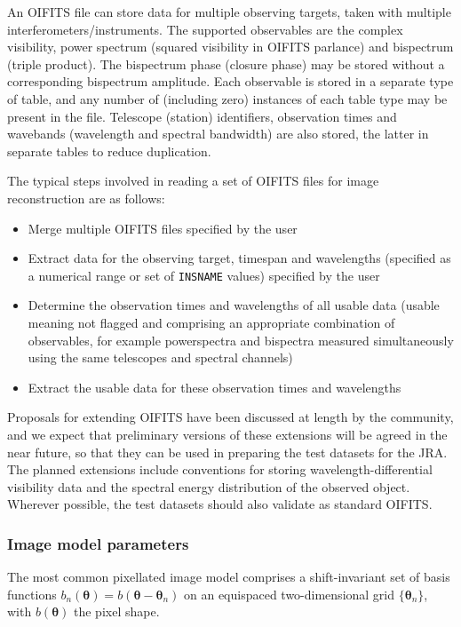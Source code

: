\documentclass{article}
\newcommand{\V}[1]{\boldsymbol{#1}}      %
\newcommand{\Dirn}{\theta}            %
\newcommand{\VDirn}{\V{\Dirn}}
\newcommand{\BasisFunc}{b}
\newcommand{\OIFITS}{OIFITS\xspace} %
\begin{document}
An \OIFITS file can store data for multiple observing targets, taken with
multiple interferometers/instruments. The supported observables are the
complex visibility, power spectrum (squared visibility in \OIFITS parlance)
and bispectrum (triple product). The bispectrum phase (closure phase) may be
stored without a corresponding bispectrum amplitude. Each observable is stored
in a separate type of table, and any number of (including zero) instances of
each table type may be present in the file. Telescope (station) identifiers,
observation times and wavebands (wavelength and spectral bandwidth) are also
stored, the latter in separate tables to reduce duplication.

The typical steps involved in reading a set of \OIFITS files for image
reconstruction are as follows:
\begin{itemize}
\item Merge multiple \OIFITS files specified by the user

\item Extract data for the observing target, timespan and wavelengths
  (specified as a numerical range or set of \verb+INSNAME+ values) specified
  by the user

\item Determine the observation times and wavelengths of all usable data
  (usable meaning not flagged and comprising an appropriate combination of
  observables, for example powerspectra and bispectra measured simultaneously
  using the same telescopes and spectral channels)

\item Extract the usable data for these observation times and wavelengths
\end{itemize}

Proposals for extending \OIFITS have been discussed at length by the
community, and we expect that preliminary versions of these extensions will be
agreed in the near future, so that they can be used in preparing the test
datasets for the JRA. The planned extensions include conventions for storing
wavelength-differential visibility data and the spectral energy distribution
of the observed object. Wherever possible, the test datasets should also
validate as standard OIFITS.

\subsubsection{Image model parameters}

The most common pixellated image model comprises a shift-invariant set of
basis functions $\BasisFunc_n(\VDirn) = \BasisFunc(\VDirn - \VDirn_n)$ on an
equispaced two-dimensional grid $\{\VDirn_n\}$, with $\BasisFunc(\VDirn)$ the
pixel shape.
\end{document}
